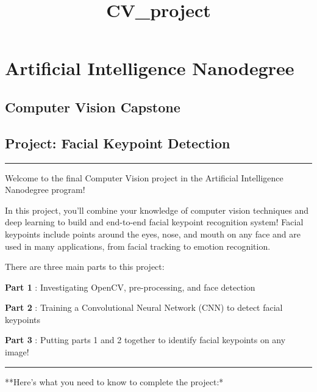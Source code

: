 \documentclass[11pt]{article}
\title{CV\_project}
\begin{document}
    
    
    \maketitle
    
    

    
    \section{Artificial Intelligence
Nanodegree}\label{artificial-intelligence-nanodegree}

\subsection{Computer Vision Capstone}\label{computer-vision-capstone}

\subsection{Project: Facial Keypoint
Detection}\label{project-facial-keypoint-detection}

\begin{center}\rule{0.5\linewidth}{\linethickness}\end{center}

Welcome to the final Computer Vision project in the Artificial
Intelligence Nanodegree program!

In this project, you'll combine your knowledge of computer vision
techniques and deep learning to build and end-to-end facial keypoint
recognition system! Facial keypoints include points around the eyes,
nose, and mouth on any face and are used in many applications, from
facial tracking to emotion recognition.

There are three main parts to this project:

\textbf{Part 1} : Investigating OpenCV, pre-processing, and face
detection

\textbf{Part 2} : Training a Convolutional Neural Network (CNN) to
detect facial keypoints

\textbf{Part 3} : Putting parts 1 and 2 together to identify facial
keypoints on any image!

\begin{center}\rule{0.5\linewidth}{\linethickness}\end{center}

**Here's what you need to know to complete the project:*
\end{document}
